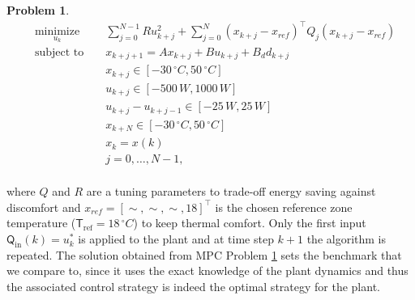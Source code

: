 \documentclass[letterpaper, 10 pt, conference]{ifacconf}  %
\newtheorem{problem}{Problem}
\begin{document}
\begin{problem}\label{pbMPC}
\small
\begin{equation}
\begin{aligned}
& \underset{u_k}{\text{minimize}} & &  \sum_{j=0}^{N-1} Ru_{k+j}^2 + \sum_{j=0}^N \left( x_{k+j} - x_{ref}\right)^\top Q_j
																			      \left( x_{k+j} - x_{ref}\right)              \\
& \text{subject to }              & &  x_{k+j+1}          =  A x_{k+j}+B u_{k+j}+B_d d_{k+j} \label{eqHAMLabLTIModelOptimization}                \\
&                                 & &  x_{k+j}           \in [-30\,^\circ C,50\,^\circ C]                                                        \\
&                                 & &  u_{k+j}           \in [-500\,W,1000\,W] 																     \\
&                                 & &  u_{k+j}-u_{k+j-1} \in [-25\,W,25\,W]																	     \\
&                                 & &  x_{k+N}           \in [-30\,^\circ C,50\,^\circ C]    									                 \\
&                                 & &  x_k                =  x(k)                                                                                \\
&                                 & &  j                  =  0,\dots,N-1,                                                                        \\
\end{aligned}
\end{equation}
\normalsize
\end{problem}

where $Q$ and $R$ are a tuning parameters to trade-off energy saving against discomfort and $x_{ref} = [\sim, \sim, \sim, 18]^\top$ is the chosen reference zone temperature ($\mathsf{T}_{\mathrm{ref}} = 18\,^\circ C$) to keep thermal comfort. Only the first input $\mathsf{Q}_{\mathrm{in}}(k) = u^*_k$ is applied to the plant and at time step $k+1$ the algorithm is repeated. The solution obtained from MPC Problem \ref{pbMPC} sets the benchmark that we compare to, since it uses the exact knowledge of the plant dynamics and thus the associated control strategy is indeed the optimal strategy for the plant.
\end{document}
